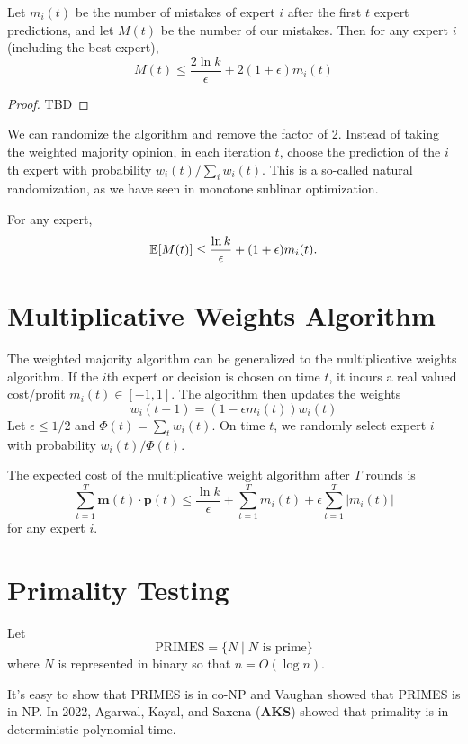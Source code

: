 \begin{theorem}
    Let $m_i(t)$ be the number of mistakes of expert $i$ after the first $t$ expert predictions, and let $M(t)$ be the number of our mistakes. Then for any expert $i$ (including the best expert),
    $$
    M(t) \leq \frac{2 \ln k}{\epsilon} + 2(1+\epsilon)m_i(t)
    $$
\end{theorem}

\begin{proof}
    TBD
\end{proof}

We can randomize the algorithm and remove the factor of 2. Instead of taking the weighted majority opinion, in each iteration $t$, choose the prediction of the $i$th expert with probability $w_i(t) / \sum_{i} w_i(t)$. This is a so-called natural randomization, as we have seen in monotone sublinar optimization.

\begin{theorem}
    For any expert,
    $$
    \mathbb{E}[M(t)] \leq \frac{\ln k}{\epsilon} + (1 + \epsilon) m_i(t).
    $$
\end{theorem}

\section{Multiplicative Weights Algorithm}

The weighted majority algorithm can be generalized to the multiplicative weights algorithm. If the $i$th expert or decision is chosen on time $t$, it incurs a real valued cost/profit $m_i(t) \in [-1,1]$. The algorithm then updates the weights
$$
w_i(t+1) = (1 - \epsilon m_i(t)) w_i(t)
$$
Let $\epsilon \leq 1/2$ and $\Phi(t) = \sum_{t} w_i(t)$. On time $t$, we randomly select expert $i$ with probability $w_i(t) / \Phi(t)$.

\begin{theorem}
    The expected cost of the multiplicative weight algorithm after $T$ rounds is
    $$
    \sum_{t = 1}^T \mathbf{m}(t) \cdot \mathbf{p}(t) \leq \frac{\ln k}{\epsilon} + \sum_{t=1}^T m_i(t) + \epsilon \sum_{t=1}^T |m_i(t)|
    $$
    for any expert $i$.
\end{theorem}

\section{Primality Testing}

Let
$$
\mathrm{PRIMES} = \{N \mid \text{$N$ is prime}\}
$$
where $N$ is represented in binary so that $n = O(\log n)$.

It's easy to show that PRIMES is in co-NP and Vaughan showed that PRIMES is in NP. In 2022, Agarwal, Kayal, and Saxena (\textbf{AKS}) showed that primality is in deterministic polynomial time.

